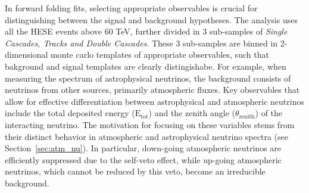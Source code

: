 In forward folding fits, selecting appropriate observables is crucial for distinguishing between the signal and background hypotheses. The analysis uses all the HESE events above 60 TeV, further divided in 3 sub-samples of \emph{Single Cascades, Tracks and Double Cascades}. These 3 sub-samples are binned in 2-dimensional monte carlo templates of appropriate observables, such that bakground and signal templates are clearly distingishabe. For example, when measuring the spectrum of astrophysical neutrinos, the background consists of neutrinos from other sources, primarily atmospheric fluxes. Key observables that allow for effective differentiation between astrophysical and atmospheric neutrinos include the total deposited energy ($\mathrm{E}_\mathrm{tot}$) and the zenith angle ($\theta_{\mathrm{zenith}}$) of the interacting neutrino. The motivation for focusing on these variables stems from their distinct behavior in atmospheric and astrophysical neutrino spectra (see Section~\ref{sec:atm_nu}). In particular, down-going atmospheric neutrinos are efficiently suppressed due to the self-veto effect, while up-going atmospheric neutrinos, which cannot be reduced by this veto, become an irreducible background. 

